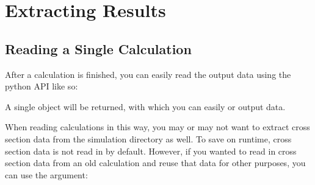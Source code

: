 \documentclass[letterpaper,10pt,english,openany,oneside]{sphinxmanual}
\begin{document}
\sphinxstepscope


\section{Extracting Results}
\label{\detokenize{ext_guide:extracting-results}}\label{\detokenize{ext_guide::doc}}

\subsection{Reading a Single Calculation}
\label{\detokenize{ext_guide:reading-a-single-calculation}}
\sphinxAtStartPar
After a calculation is finished, you can easily read the output
data using the python API like so:

\begin{sphinxVerbatim}[commandchars=\\\{\}]
 

  
\end{sphinxVerbatim}

\sphinxAtStartPar
A single {\hyperref[\detokenize{api/pytb.ThunderBoltz:pytb.ThunderBoltz}]{}} object will be returned, with which
you can easily {\hyperref[\detokenize{ext_guide:exporting-data}]{}} or {\hyperref[\detokenize{ext_guide:plotting-results}]{}}
output data.

\sphinxAtStartPar
When reading calculations in this way, you may or may not want to extract
cross section data from the simulation directory as well. To save on
runtime, cross section data is not read in by default. However, if you wanted
to read in cross section data from an old calculation and reuse that
data for other purposes, you can use the  argument:

\begin{sphinxVerbatim}[commandchars=\\\{\}]
 

   

\end{sphinxVerbatim}
\end{document}
